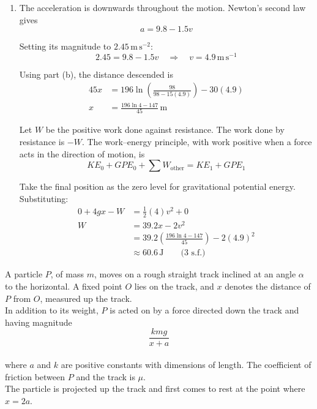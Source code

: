 \documentclass[leqno]{article}
\begin{document}
\begin{enumerate}[
  label=\textbf{\arabic*.},
  leftmargin=*,
  topsep=0pt,
  partopsep=0pt,
  parsep=0pt
]
\begin{djsSolution}
\begin{enumerate}[label=\textbf{(\alph*)}, start=1]
\item The acceleration is downwards throughout the motion. Newton's second law gives
\[
a=9.8-1.5v
\]

Setting its magnitude to \(2.45\,\mathrm{m\,s^{-2}}\):
\[
2.45=9.8-1.5v
\quad\Longrightarrow\quad
v=4.9\,\mathrm{m\,s^{-1}}
\]

Using part (b), the distance descended is
\begin{align*}
45x&=196\ln\left(\frac{98}{98-15(4.9)}\right)-30(4.9)\\
x&=\frac{196\ln4-147}{45}\,\mathrm{m}
\end{align*}

Let \(W\) be the positive work done against resistance. The work done by resistance is \(-W\). The work--energy principle, with work positive when a force acts in the direction of motion, is
\[
KE_0+GPE_0+\sum W_{\text{other}}
=KE_1+GPE_1
\]

Take the final position as the zero level for gravitational potential energy. Substituting:
\begin{align*}
0+4gx-W&=\frac12(4)v^2+0\\
W&=39.2x-2v^2\\
&=39.2\left(\frac{196\ln4-147}{45}\right)-2(4.9)^2\\
&\approx60.6\,\mathrm{J}\qquad\text{(3 s.f.)}
\end{align*}
\end{enumerate}
\end{djsSolution}

\newpage

\questionitem

A particle $P$, of mass $m$, moves on a rough straight track inclined at an angle $\alpha$ to the horizontal. A fixed point $O$ lies on the track, and $x$ denotes the distance of $P$ from $O$, measured up the track. \\

In addition to its weight, $P$ is acted on by a force directed down the track and having magnitude
\[
\frac{kmg}{x+a}
\] \\
where $a$ and $k$ are positive constants with dimensions of length. The coefficient of friction between $P$ and the track is $\mu$. \\

The particle is projected up the track and first comes to rest at the point where $x=2a$. \\


\end{enumerate}
\end{document}
